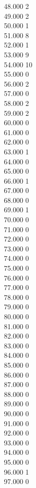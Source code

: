 { 48.000	2 \\
 49.000	2 \\
 50.000	1 \\
 51.000	8 \\
 52.000	1 \\
 53.000	9 \\
 54.000	10 \\
 55.000	0 \\
 56.000	2 \\
 57.000	0 \\
 58.000	2 \\
 59.000	2 \\
 60.000	0 \\
 61.000	0 \\
 62.000	0 \\
 63.000	1 \\
 64.000	0 \\
 65.000	0 \\
 66.000	1 \\
 67.000	0 \\
 68.000	0 \\
 69.000	1 \\
 70.000	0 \\
 71.000	0 \\
 72.000	0 \\
 73.000	0 \\
 74.000	0 \\
 75.000	0 \\
 76.000	0 \\
 77.000	0 \\
 78.000	0 \\
 79.000	0 \\
 80.000	0 \\
 81.000	0 \\
 82.000	0 \\
 83.000	0 \\
 84.000	0 \\
 85.000	0 \\
 86.000	0 \\
 87.000	0 \\
 88.000	0 \\
 89.000	0 \\
 90.000	0 \\
 91.000	0 \\
 92.000	0 \\
 93.000	0 \\
 94.000	0 \\
 95.000	0 \\
 96.000	1 \\
 97.000	0 \\
}
